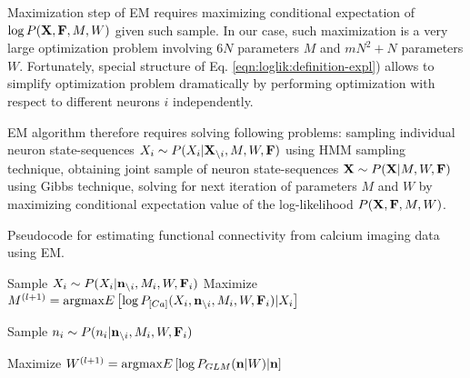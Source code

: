 Maximization step of EM requires maximizing conditional expectation of $\log P({\bf X}, {\bf F}, M, W)$ given such sample. In our case, such maximization is a very large optimization problem involving $6N$ parameters $M$ and $mN^2+N$ parameters $W$. Fortunately, special structure of Eq. \eqref{eqn:loglik:definition-expl}) allows to simplify optimization problem dramatically by performing optimization with respect to different neurons $i$ independently.

EM algorithm therefore requires solving following problems: sampling individual neuron state-sequences $X_i\sim P(X_{i}|{\bf X}_{\backslash i}, M, W, {\bf F})$ using HMM sampling technique, obtaining joint sample of neuron state-sequences ${\bf X}\sim P({\bf X}|M, W, {\bf F})$ using Gibbs technique, solving for next iteration of parameters $M$ and $W$ by maximizing conditional expectation value of the log-likelihood $P({\bf X}, {\bf F}, M, W)$.

\begin{algorithm}
\caption{Pseudocode for estimating functional connectivity from calcium imaging data using EM.}\label{eqn:pseudocode}
\begin{algorithmic}
      \State Sample $X_i \sim P(X_i|{\bf n}_{\backslash i}, M_i, W, {\bf F}_i)$
      \State Maximize $M^{(l+1)}=\text{argmax} E\left[\log P_{[Ca]}(X_i, {\bf n}_{\backslash i}, M_i, W, {\bf F}_i)|X_i\right]$
    \EndWhile
  \EndFor
  
      \State Sample $n_i \sim P(n_i|{\bf n}_{\backslash i}, M_i, W, {\bf F}_i)$
    \EndFor
  \EndFor 

  \State Maximize $W^{(l+1)}=\text{argmax} E\left[\log P_{GLM}({\bf n}|W)|{\bf n}\right]$  
\EndWhile
\end{algorithmic}
\end{algorithm}
